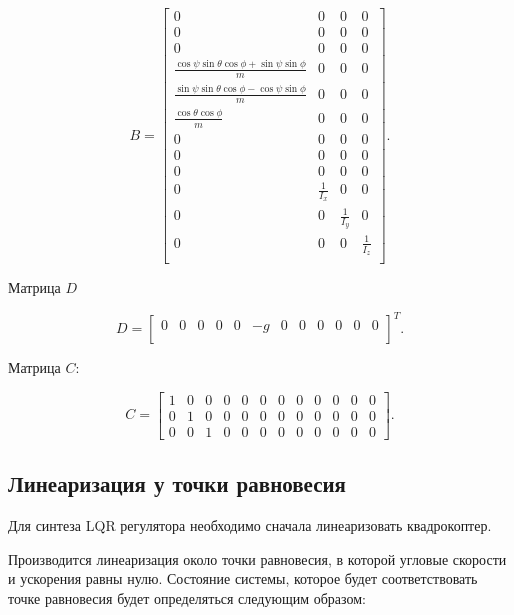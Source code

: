 \begin{equation}
B = \begin{bmatrix}
    0 & 0 & 0 & 0 \\
    0 & 0 & 0 & 0 \\
    0 & 0 & 0 & 0 \\
    \frac{\cos \psi \sin \theta \cos \phi + \sin \psi \sin \phi}{m} & 0 & 0 & 0 \\
    \frac{\sin \psi \sin \theta \cos \phi - \cos \psi \sin \phi}{m} & 0 & 0 & 0 \\
    \frac{\cos\theta\cos\phi}{m} & 0 & 0 & 0 \\
    0 & 0 & 0 & 0 \\
    0 & 0 & 0 & 0 \\
    0 & 0 & 0 & 0 \\
    0 & \frac{1}{I_x} & 0 & 0 \\
    0 & 0 & \frac{1}{I_y} & 0 \\
    0 & 0 & 0 & \frac{1}{I_z} \\
    \end{bmatrix}.
\end{equation}

\newpage

Матрица \(D\)

\begin{equation}
D = \begin{bmatrix}
    0 & 0 & 0 & 0 & 0 & -g & 0 & 0 & 0 & 0 & 0 & 0 \\
\end{bmatrix}^T.
\end{equation}

Матрица \(C\):

\begin{equation}
C = \begin{bmatrix}
    1 & 0 & 0 & 0 & 0 & 0 & 0 & 0 & 0 & 0 & 0 & 0 \\
    0 & 1 & 0 & 0 & 0 & 0 & 0 & 0 & 0 & 0 & 0 & 0 \\
    0 & 0 & 1 & 0 & 0 & 0 & 0 & 0 & 0 & 0 & 0 & 0 
\end{bmatrix}.
\end{equation}

\subsection{Линеаризация у точки равновесия}

Для синтеза LQR регулятора необходимо сначала линеаризовать квадрокоптер.

Производится линеаризация около точки равновесия, в которой угловые 
скорости и ускорения равны нулю. Состояние системы, которое будет соответствовать точке 
равновесия будет определяться следующим образом:

